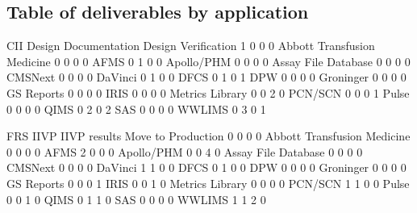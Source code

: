\documentclass{article}
\begin{document}
\subsection{Table of deliverables by application}
\begin{Schunk}
\begin{Soutput}
                                 CII Design Documentation Design Verification
                               1   0                    0                   0
  Abbott Transfusion Medicine  0   0                    0                   0
  AFMS                         0   1                    0                   0
  Apollo/PHM                   0   0                    0                   0
  Assay File Database          0   0                    0                   0
  CMSNext                      0   0                    0                   0
  DaVinci                      0   1                    0                   0
  DFCS                         0   1                    0                   1
  DPW                          0   0                    0                   0
  Groninger                    0   0                    0                   0
  GS Reports                   0   0                    0                   0
  IRIS                         0   0                    0                   0
  Metrics Library              0   0                    2                   0
  PCN/SCN                      0   0                    0                   1
  Pulse                        0   0                    0                   0
  QIMS                         0   2                    0                   2
  SAS                          0   0                    0                   0
  WWLIMS                       0   3                    0                   1
                             
                              FRS IIVP IIVP results Move to Production
                                0    0            0                  0
  Abbott Transfusion Medicine   0    0            0                  0
  AFMS                          2    0            0                  0
  Apollo/PHM                    0    0            4                  0
  Assay File Database           0    0            0                  0
  CMSNext                       0    0            0                  0
  DaVinci                       1    1            0                  0
  DFCS                          0    1            0                  0
  DPW                           0    0            0                  0
  Groninger                     0    0            0                  0
  GS Reports                    0    0            0                  1
  IRIS                          0    0            1                  0
  Metrics Library               0    0            0                  0
  PCN/SCN                       1    1            0                  0
  Pulse                         0    0            1                  0
  QIMS                          0    1            1                  0
  SAS                           0    0            0                  0
  WWLIMS                        1    1            2                  0
                             

\end{Soutput}
\end{Schunk}
\end{document}
